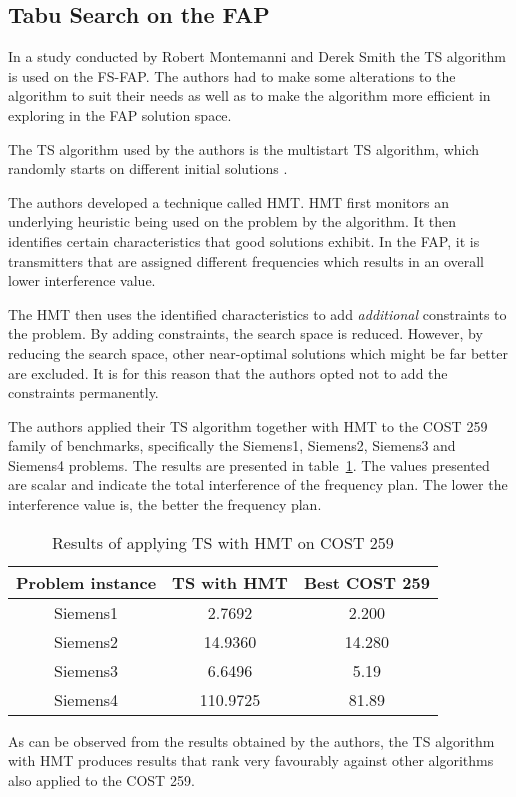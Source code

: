 \subsection{Tabu Search on the \gls{FAP}}
In a study conducted by Robert Montemanni and Derek Smith \cite{TabuMontemanniSmith} the \gls{TS} algorithm is used on the \gls{FS-FAP}. The authors had to make some alterations to the algorithm to suit their needs as well as to make the algorithm more efficient in exploring in the \gls{FAP} solution space.

The \gls{TS} algorithm used by the authors is the multistart \gls{TS} algorithm, which randomly starts on different initial solutions \cite{TabuMontemanniSmith}.

The authors developed a technique called \gls{HMT}. \gls{HMT} first monitors an underlying heuristic being used on the problem by the algorithm\cite{TabuMontemanniSmith}. It then identifies certain characteristics that good solutions exhibit. In the \gls{FAP}, it is transmitters that are assigned different frequencies which results in an overall lower interference value\cite{TabuMontemanniSmith}.

The HMT then uses the identified characteristics to add \emph{additional} constraints to the problem\cite{TabuMontemanniSmith}. By adding constraints, the search space is reduced. However, by reducing the search space, other near-optimal solutions which might be far better are excluded\cite{TabuMontemanniSmith}. It is for this reason that the authors opted not to add the constraints permanently.

The authors applied their \gls{TS} algorithm together with HMT to the \gls{COST} 259 family of benchmarks, specifically the Siemens1, Siemens2, Siemens3 and Siemens4 problems. The results are presented in table~\ref{TSCOST259}. The values presented are scalar and indicate the total interference of the frequency plan. The lower the interference value is, the better the frequency plan.
\begin{table}[H]
\centering
	\begin{tabular}{| c | c | c |}
		\hline
		Problem instance & \gls{TS} with \gls{HMT} & Best \gls{COST} 259 \\ \hline
		Siemens1 & 2.7692 & 2.200 \\ \hline
		Siemens2 & 14.9360 & 14.280 \\ \hline
		Siemens3 & 6.6496 & 5.19 \\ \hline
		Siemens4 & 110.9725 & 81.89 \\ \hline
	\end{tabular}
\caption{Results of applying \gls{TS} with \gls{HMT} on \gls{COST} 259}
\label{TSCOST259}
\end{table}
As can be observed from the results obtained by the authors, the \gls{TS} algorithm with HMT produces results that rank very favourably against other algorithms also applied to the \gls{COST} 259.

